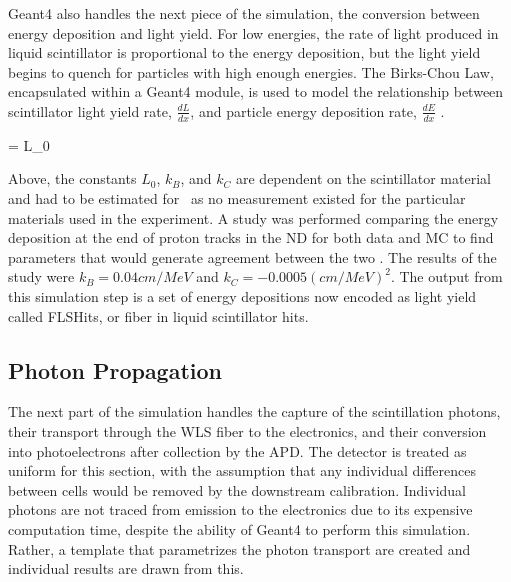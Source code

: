Geant4 also handles the next piece of the simulation, the conversion between energy deposition and light yield. For low energies, the rate of light produced in liquid scintillator is proportional to the energy deposition, but the light yield begins to quench for particles with high enough energies. The Birks-Chou Law, encapsulated within a Geant4 module, is used to model the relationship between scintillator light yield rate, $\frac{dL}{dx}$, and particle energy deposition rate, $\frac{dE}{dx}$ \cite{ref:BirksChou}.

\beq
{} = L_0  
\label{eq:BirksChou}
\eeq

\n Above, the constants $L_0$, $k_B$, and $k_C$ are dependent on the scintillator material and had to be estimated for \nova~as no measurement existed for the particular materials used in the experiment. A study was performed comparing the energy deposition at the end of proton tracks in the ND for both data and MC to find parameters that would generate agreement between the two \cite{ref:DanBirks}. The results of the study were $k_B = 0.04\unit{cm/MeV}$ and $k_C = -0.0005\unit{(cm/MeV)}^2$. The output from this simulation step is a set of energy depositions now encoded as light yield called FLSHits, or fiber in liquid scintillator hits.

\subsection{Photon Propagation}
\label{sec:Photon}

The next part of the simulation handles the capture of the scintillation photons, their transport through the WLS fiber to the electronics, and their conversion into photoelectrons after collection by the APD. The detector is treated as uniform for this section, with the assumption that any individual differences between cells would be removed by the downstream calibration. Individual photons are not traced from emission to the electronics due to its expensive computation time, despite the ability of Geant4 to perform this simulation. Rather, a template that parametrizes the photon transport are created and individual results are drawn from this.

